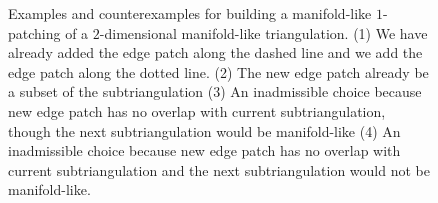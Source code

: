 \documentclass[a4paper]{amsart}
\begin{document}
\begin{figure}
    \caption{Examples and counterexamples for building a manifold-like $1$-patching of a $2$-dimensional manifold-like triangulation. (1) We have already added the edge patch along the dashed line and we add the edge patch along the dotted line. (2) The new edge patch already be a subset of the subtriangulation (3) An inadmissible choice because new edge patch has no overlap with current subtriangulation, though the next subtriangulation would be manifold-like (4) An inadmissible choice because new edge patch has no overlap with current subtriangulation and the next subtriangulation would not be manifold-like.}\label{figure:illustrationpatching}
\end{figure}
\end{document}
